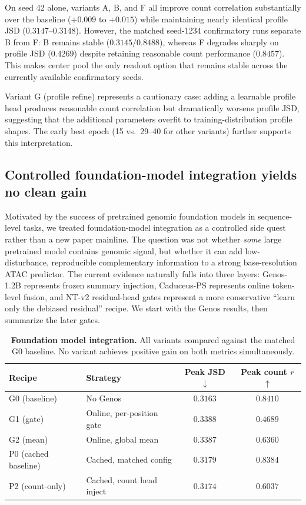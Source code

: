 \documentclass[11pt,a4paper]{article}
\begin{document}
\noindent On seed 42 alone, variants A, B, and F all improve count
correlation substantially over the baseline ($+0.009$ to $+0.015$) while
maintaining nearly identical profile JSD ($0.3147$--$0.3148$). However,
the matched seed-1234 confirmatory runs separate B from F: B remains
stable (\(0.3145 / 0.8488\)), whereas F degrades sharply on profile
JSD (\(0.4269\)) despite retaining reasonable count performance
(\(0.8457\)). This makes center pool the only readout option that
remains stable across the currently available confirmatory seeds.

Variant G (profile refine) represents a cautionary case: adding a learnable
profile head produces reasonable count correlation but dramatically
worsens profile JSD, suggesting that the additional parameters overfit
to training-distribution profile shapes. The early best epoch (15 vs.\
29--40 for other variants) further supports this interpretation.

\subsection{Controlled foundation-model integration yields no clean gain}
\label{sec:genos}

Motivated by the success of pretrained genomic foundation models in
sequence-level tasks, we treated foundation-model integration as a
controlled side quest rather than a new paper mainline. The question was
not whether \emph{some} large pretrained model contains genomic signal,
but whether it can add low-disturbance, reproducible complementary
information to a strong base-resolution ATAC predictor. The current
evidence naturally falls into three layers: Genos-1.2B
\cite{genos2025} represents frozen summary injection, Caduceus-PS
represents online token-level fusion, and NT-v2 residual-head gates
represent a more conservative ``learn only the debiased residual''
recipe. We start with the Genos results, then summarize the later gates.

\begin{table}[H]
\centering
\small
\caption{\textbf{Foundation model integration.} All variants compared
against the matched G0 baseline. No variant achieves positive gain on
both metrics simultaneously.}
\label{tab:genos}
\begin{tabular}{llcc}
\toprule
Recipe & Strategy & Peak JSD $\downarrow$ & Peak count $r$ $\uparrow$ \\
\midrule
G0 (baseline) & No Genos & $0.3163$ & $\mathbf{0.8410}$ \\
\midrule
G1 (gate) & Online, per-position gate & $0.3388$ & $0.4689$ \\
G2 (mean) & Online, global mean & $0.3387$ & $0.6360$ \\
P0 (cached baseline) & Cached, matched config & $0.3179$ & $0.8384$ \\
P2 (count-only) & Cached, count head inject & $\mathbf{0.3174}$ & $0.6037$ \\
\bottomrule
\end{tabular}
\end{table}
\end{document}
